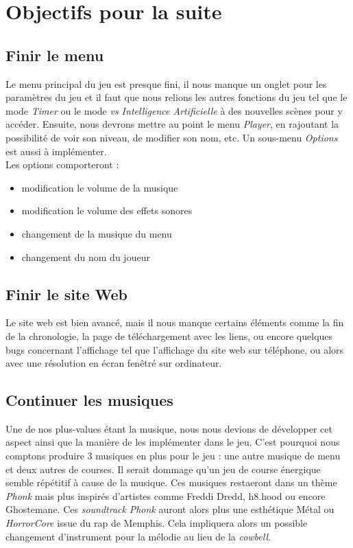 \documentclass[12pt,a4paper]{article}
\newcommand{\AI}{Intelligence Artificielle}
\begin{document}
\section{Objectifs pour la suite}
    \subsection{Finir le menu}
        Le menu principal du jeu est presque fini, il nous manque un onglet 
        pour les paramètres du jeu et il faut que nous relions les autres
        fonctions du jeu tel que le mode \textit{Timer} ou le mode \textit{vs \AI}
        à des nouvelles scènes pour y accéder. Ensuite, nous devrons mettre 
        au point le menu \textit{Player}, en rajoutant la possibilité de 
        voir son niveau, de modifier son nom, etc. Un sous-menu \textit{Options}
        est aussi à implémenter.\\
        Les options comporteront :
        \begin{itemize}
            \item modification le volume de la musique
            \item modification le volume des effets sonores
            \item changement de la musique du menu
            \item changement du nom du joueur
        \end{itemize}

    \subsection{Finir le site Web}
        Le site web est bien avancé, mais il nous manque certains éléments 
        comme la fin de la chronologie, la page de téléchargement avec les liens,
        ou encore quelques bugs concernant l'affichage tel que l'affichage du
        site web sur téléphone, ou alors avec une résolution en écran fenêtré sur ordinateur.
        
    \subsection{Continuer les musiques}
        Une de nos plus-values étant la musique, nous nous devions de développer cet aspect
        ainsi que la manière de les implémenter dans le jeu. C'est pourquoi nous comptons
        produire 3 musiques en plus pour le jeu : une autre musique de menu et deux autres
        de courses. Il serait dommage qu'un jeu de course énergique semble répétitif à cause
        de la musique. Ces musiques restaeront dans un thème \textsl{Phonk} mais plus inspirés d'artistes
        comme Freddi Dredd, h8.hood ou encore Ghostemane. Ces \textit{soundtrack} \textit{Phonk} auront alors plus
        une esthétique Métal ou \textit{HorrorCore} issue du rap de Memphis. Cela impliquera alors 
        un possible changement d'instrument pour la mélodie au lieu de la \textit{cowbell}.
        
\end{document}
